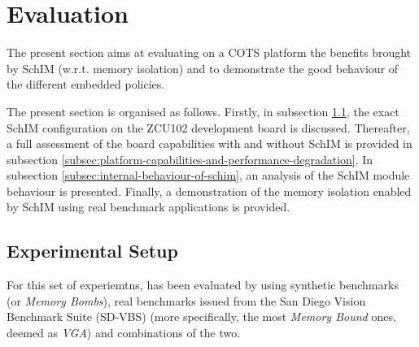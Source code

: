 \section{Evaluation}

  The present section aims at evaluating on a COTS platform the benefits brought by SchIM (w.r.t. memory isolation) and to demonstrate the good behaviour of the different embedded policies.
  
  The present section is organised as follows. Firstly, in subsection \ref{subsection:considered-architecture}, the exact SchIM configuration on the ZCU102 development board is discussed. Thereafter, a full assessment of the board capabilities with and without SchIM is provided in subsection \ref{subsec:platform-capabilities-and-performance-degradation}. In subsection \ref{subsec:internal-behaviour-of-schim}, an analysis of the SchIM module behaviour is presented. Finally, a demonstration of the memory isolation enabled by SchIM using real benchmark applications is provided.

  
  \subsection{Experimental Setup}
    \label{subsection:considered-architecture}
    For this set of experiemtns, \schim has been evaluated by using synthetic benchmarks (or \emph{Memory Bombs}), real benchmarks issued from the San Diego Vision Benchmark Suite (SD-VBS) \cite{SD-VBS} (more specifically, the most \emph{Memory Bound} ones, deemed as \emph{VGA}) and combinations of the two.

